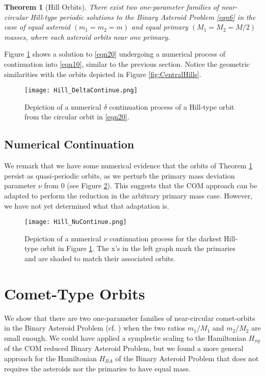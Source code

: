 \documentclass[12pt]{article}
\newtheorem{theorem}{Theorem}
\begin{document}
\begin{theorem}[Hill Orbits]\label{thm2}
There exist two one-parameter families of near-circular Hill-type periodic solutions to the Binary Asteroid Problem \eqref{eqn6} in the case of equal asteroid $(m_1 = m_2 = m)$ and equal primary  $(M_1 = M_2 = M/2)$ masses, where each asteroid orbits near one primary.
\end{theorem}


Figure \ref{fig1} shows a solution to \eqref{eqn20} undergoing a numerical process of continuation into \eqref{eqn10}, similar to the previous section. Notice the geometric similarities with the orbits depicted in Figure \ref{fig:CentralHills}.

\begin{figure}[ht]%
\centering
\texttt{[image: Hill\_DeltaContinue.png]}
\caption{Depiction of a numerical $\delta$ continuation process of a Hill-type orbit from the circular orbit in \eqref{eqn20}.
}\label{fig1}
\end{figure}

\subsection{Numerical Continuation}
We remark that we have some numerical evidence that the orbits of Theorem \ref{thm2} persist as quasi-periodic orbits, as we perturb the primary mass deviation parameter $\nu$ from $0$ (see Figure \ref{fig2}). This suggests that the COM approach can be adapted to perform the reduction in the arbitrary primary mass case. However, we have not yet determined what that adaptation is.

\begin{figure}[ht]%
\centering
\texttt{[image: Hill\_NuContinue.png]}
\caption{Depiction of a numerical $\nu$ continuation process for the darkest Hill-type orbit in Figure \ref{fig1}. The x's in the left graph mark the primaries and are shaded to match their associated orbits.}\label{fig2}
\end{figure}


\section{Comet-Type Orbits}
We show that there are two one-parameter families of near-circular comet-orbits in the Binary Asteroid Problem (cf. \cite{meyerOffin,Stoica}) when the two ratios $m_1/M_1$ and $m_2/M_2$ are small enough. We could have applied a symplectic scaling to the Hamiltonian $H_{xy}$ of the COM reduced Binary Asteroid Problem, but we found a more general approach for the Hamiltonian $H_{BA}$ of the Binary Asteroid Problem that does not requires the asteroids nor the primaries to have equal mass.
\end{document}
